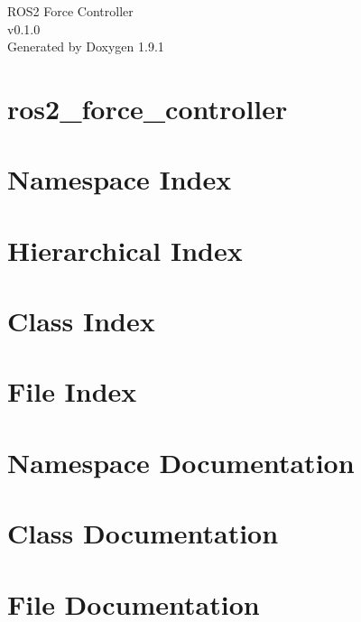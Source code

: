\let\mypdfximage\pdfximage\def\pdfximage{\immediate\mypdfximage}\documentclass[twoside]{book}
\newcommand{\+}{\discretionary{\mbox{\scriptsize$\hookleftarrow$}}{}{}}
\newcommand{\clearemptydoublepage}{%
  \newpage{\pagestyle{empty}\cleardoublepage}%
}
\begin{document}
\raggedbottom

\hypersetup{pageanchor=false,
             bookmarksnumbered=true,
             pdfencoding=unicode
            }
\begin{titlepage}
\vspace*{7cm}
\begin{center}%
{\Large ROS2 Force Controller \\[1ex]\large v0.\+1.\+0 }\\
\vspace*{1cm}
{\large Generated by Doxygen 1.9.1}\\
\end{center}
\end{titlepage}
\clearemptydoublepage
{}
\tableofcontents
\clearemptydoublepage
{}
\hypersetup{pageanchor=true}

\chapter{ros2\+\_\+force\+\_\+controller}
\label{index}\hypertarget{index}{}
\chapter{Namespace Index}

\chapter{Hierarchical Index}

\chapter{Class Index}

\chapter{File Index}

\chapter{Namespace Documentation}




\chapter{Class Documentation}


\chapter{File Documentation}







\backmatter
\newpage
{}
\clearemptydoublepage
{}
\printindex
\end{document}
